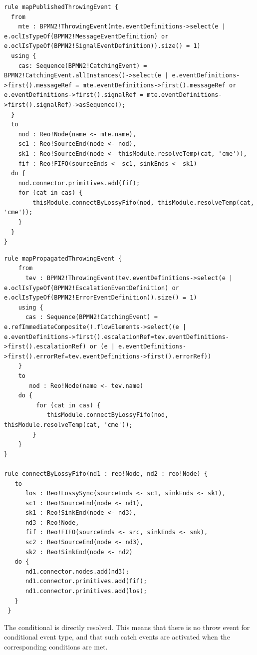 \begin{lstlisting}[float,frame=single,caption=Mapping published throw message event,label=lst:throwsignalevent]  
rule mapPublishedThrowingEvent {
  from
    mte : BPMN2!ThrowingEvent(mte.eventDefinitions->select(e | e.oclIsTypeOf(BPMN2!MessageEventDefinition) or e.oclIsTypeOf(BPMN2!SignalEventDefinition)).size() = 1)
  using {
    cas: Sequence(BPMN2!CatchingEvent) = BPMN2!CatchingEvent.allInstances()->select(e | e.eventDefinitions->first().messageRef = mte.eventDefinitions->first().messageRef or e.eventDefinitions->first().signalRef = mte.eventDefinitions->first().signalRef)->asSequence();
  }
  to
    nod : Reo!Node(name <- mte.name),
    sc1 : Reo!SourceEnd(node <- nod),
    sk1 : Reo!SourceEnd(node <- thisModule.resolveTemp(cat, 'cme')),
    fif : Reo!FIFO(sourceEnds <- sc1, sinkEnds <- sk1)
  do {
    nod.connector.primitives.add(fif);
    for (cat in cas) {
        thisModule.connectByLossyFifo(nod, thisModule.resolveTemp(cat, 'cme'));
    }
  }
}
\end{lstlisting}

\begin{lstlisting}[float,frame=single,caption=Mapping propagated throw events,label=lst:restthrow]
rule mapPropagatedThrowingEvent {
    from
      tev : BPMN2!ThrowingEvent(tev.eventDefinitions->select(e | e.oclIsTypeOf(BPMN2!EscalationEventDefinition) or e.oclIsTypeOf(BPMN2!ErrorEventDefinition)).size() = 1)
    using {
      cas : Sequence(BPMN2!CatchingEvent) = e.refImmediateComposite().flowElements->select((e | e.eventDefinitions->first().escalationRef=tev.eventDefinitions->first().escalationRef) or (e | e.eventDefinitions->first().errorRef=tev.eventDefinitions->first().errorRef))
    }
    to
       nod : Reo!Node(name <- tev.name)
    do {
         for (cat in cas) {
            thisModule.connectByLossyFifo(nod, thisModule.resolveTemp(cat, 'cme'));
        }
    }
}

rule connectByLossyFifo(nd1 : reo!Node, nd2 : reo!Node) {
   to
      los : Reo!LossySync(sourceEnds <- sc1, sinkEnds <- sk1),   
      sc1 : Reo!SourceEnd(node <- nd1),
      sk1 : Reo!SinkEnd(node <- nd3),   
      nd3 : Reo!Node,
      fif : Reo!FIFO(sourceEnds <- src, sinkEnds <- snk),
      sc2 : Reo!SourceEnd(node <- nd3),
      sk2 : Reo!SinkEnd(node <- nd2)
   do {
      nd1.connector.nodes.add(nd3);
      nd1.connector.primitives.add(fif);
      nd1.connector.primitives.add(los);
   }          
 }
\end{lstlisting}

The {conditional} is directly resolved. This means that there is no {throw} event for conditional event type, and that such {catch} events are activated when the corresponding conditions are met.

